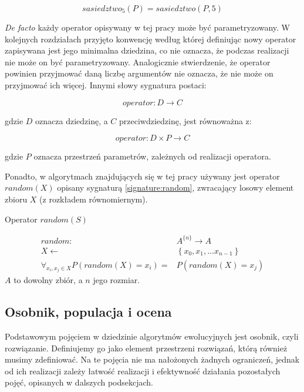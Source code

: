 \documentclass[twoside]{iisthesis}
\newcommand{\Defacto}{\emph{De facto }}
\newcommand{\withSize}[2]{{#1}^{ \{ #2 \}}}
\begin{document}
\begin{displaymath}
sasiedztwo_5 (P) = sasiedztwo (P, 5)
\end{displaymath}

\Defacto każdy operator opisywany w tej pracy może być parametryzowany. W kolejnych rozdziałach przyjęto konwencję według której definiując nowy operator zapisywana jest jego minimalna dziedzina, co nie oznacza, że podczas realizacji nie może on być parametryzowany. Analogicznie stwierdzenie, że operator powinien przyjmować daną liczbę argumentów nie oznacza, że nie może on przyjmować ich więcej. Innymi słowy sygnatura postaci:

\begin{displaymath}
operator: D \rightarrow C
\end{displaymath}

gdzie $D$ oznacza dziedzinę, a $C$ przeciwdziedzinę, jest równoważna z:

\begin{displaymath}
operator: D \times P \rightarrow C
\end{displaymath}

gdzie $P$ oznacza przestrzeń parametrów, zależnych od realizacji operatora.

Ponadto, w algorytmach znajdujących się w tej pracy używany jest operator $random(X)$ opisany sygnaturą \ref{signature:random}, zwracający losowy element zbioru $X$ (z rozkładem równomiernym).

\begin{signature}
	\caption{Operator $random(S)$ \label{signature:random}}
	\begin{align}
	random: &\withSize{A}{n} \rightarrow A \\
	X \gets &\left\{ x_0, x_1, \dots x_{n-1} \right\} \\
	\forall_{x_i, x_j \in X} P(random(X) = x_i) = &P(random(X) = x_j)
	\end{align}
	$A$ to dowolny zbiór, a $n$ jego rozmiar.
\end{signature}

\subsection{Osobnik, populacja i ocena} \label{subsection:specimen_and_foo}

Podstawowym pojęciem w dziedzinie algorytmów ewolucyjnych jest osobnik, czyli rozwiązanie. Definiujemy go jako element przestrzeni rozwiązań, którą również musimy zdefiniować. Na te pojęcia nie ma nałożonych żadnych ograniczeń, jednak od ich realizacji zależy łatwość realizacji i efektywność działania pozostałych pojęć, opisanych w dalszych podsekcjach.
\end{document}
